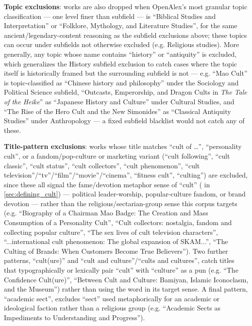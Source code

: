 \textbf{Topic exclusions}: works are also dropped when OpenAlex's most granular topic classification — one level finer than subfield — is \enquote{Biblical Studies and Interpretation} or \enquote{Folklore, Mythology, and Literature Studies}, for the same ancient/legendary-content reasoning as the subfield exclusions above; these topics can occur under subfields not otherwise excluded (e.g. Religious studies). More generally, any topic whose name contains \enquote{history} or \enquote{antiquity} is excluded, which generalizes the History subfield exclusion to catch cases where the topic itself is historically framed but the surrounding subfield is not — e.g. \enquote{Mao Cult} is topic-classified as \enquote{Chinese history and philosophy} under the Sociology and Political Science subfield, \enquote{Outcasts, Emperorship, and Dragon Cults in \textit{The Tale of the Heike}} as \enquote{Japanese History and Culture} under Cultural Studies, and \enquote{The Rise of the Hero Cult and the New Simonides} as \enquote{Classical Antiquity Studies} under Anthropology — a fixed subfield blacklist would not catch any of these.

\textbf{Title-pattern exclusions}: works whose title matches \enquote{cult of \ldots}, \enquote{personality cult}, or a fandom/pop-culture or marketing variant (\enquote{cult following}, \enquote{cult classic}, \enquote{cult status}, \enquote{cult collectors}, \enquote{cult phenomenon}, \enquote{cult television}/\enquote{tv}/\enquote{film}/\enquote{movie}/\enquote{cinema}, \enquote{fitness cult}, \enquote{culting}) are excluded, since these all signal the fame/devotion metaphor sense of \enquote{cult} (\cultfame{} in \ref{sec:defining_cult}) — political leader-worship, popular-culture fandom, or brand devotion — rather than the religious/sectarian-group sense this corpus targets (e.g. \enquote{Biography of a Chairman Mao Badge: The Creation and Mass Consumption of a Personality Cult}, \enquote{Cult collectors: nostalgia, fandom and collecting popular culture}, \enquote{The sex lives of cult television characters}, \enquote{...international cult phenomenon: The global expansion of SKAM...}, \enquote{The Culting of Brands: When Customers Become True Believers}). Two further patterns, \enquote{cult(ure)} and \enquote{cult and culture}/\enquote{cults and cultures}, catch titles that typographically or lexically pair \enquote{cult} with \enquote{culture} as a pun (e.g. \enquote{The Confidence Cult(ure)}, \enquote{Between Cult and Culture: Bamiyan, Islamic Iconoclasm, and the Museum}) rather than using the word in its target sense. A final pattern, \enquote{academic sect}, excludes \enquote{sect} used metaphorically for an academic or ideological faction rather than a religious group (e.g. \enquote{Academic Sects as Impediments to Understanding and Progress}).

